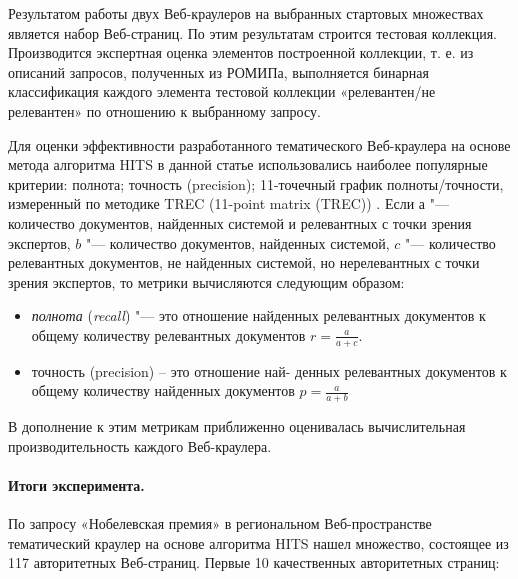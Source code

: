 Результатом работы двух Веб-краулеров на выбранных стартовых множествах является набор Веб-страниц. По этим результатам строится тестовая коллекция. Производится экспертная оценка элементов построенной коллекции, т. е. из описаний запросов, полученных из РОМИПа, выполняется бинарная классификация каждого элемента тестовой коллекции «релевантен/не релевантен» по отношению к выбранному запросу.

Для оценки эффективности разработанного тематического Веб-краулера на основе метода алгоритма HITS в данной статье использовались наиболее популярные критерии: полнота; точность (precision); 11-точечный график полноты/точности, измеренный по методике TREC (11-point matrix (TREC)) \cite{SmartEval,TREC2003,Zobel}. Если \(а\) "--- количество документов, найденных системой и релевантных с точки зрения экспертов, \(b\) "--- количество документов, найденных системой, \(c\) "--- количество релевантных документов, не найденных системой, но нерелевантных с точки зрения экспертов, то метрики вычисляются следующим образом:

\begin{itemize}
	\item \textit{полнота} (\textit{recall}) "--- это отношение найденных релевантных документов к общему количеству релевантных документов \(r = \frac{a}{a + c}\).
	\item точность (precision) – это отношение най- денных релевантных документов к общему количеству найденных документов \(p = \frac{a}{a + b}\)
\end{itemize}

В дополнение к этим метрикам приближенно оценивалась вычислительная производительность каждого Веб-краулера.

\paragraph{Итоги эксперимента.} По запросу «Нобелевская премия» в региональном Веб-пространстве тематический краулер на основе алгоритма HITS нашел множество, состоящее из 117 авторитетных Веб-страниц. Первые 10 качественных авторитетных страниц:

